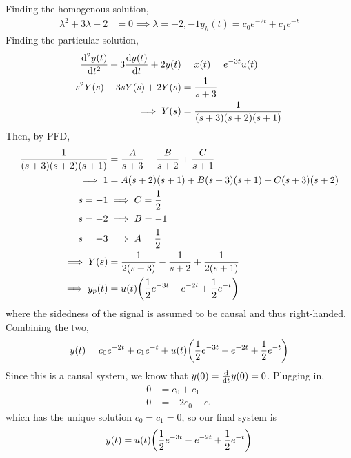 \documentclass{article}
\begin{document}
Finding the homogenous solution,
\begin{align}
    \lambda^2 + 3\lambda + 2 &= 0 \implies \lambda = -2, -1
    y_h(t) = c_0 e^{-2t} + c_1 e^{-t}
\end{align}
Finding the particular solution,
\begin{align}
    \dv[2]{y(t)}{t} + 3 \dv{y(t)}{t} + 2y(t) &= x(t) = e^{-3t} u(t) \\
    s^2 Y(s) + 3 s Y(s) + 2Y(s) &= \frac{1}{s + 3} \\
    \implies Y(s) &= \frac{1}{(s + 3) (s + 2) (s + 1)}
\end{align}
Then, by PFD,
\begin{align}
    \frac{1}{(s + 3) (s + 2) (s + 1)} &= \frac{A}{s + 3} + \frac{B}{s + 2} + \frac{C}{s + 1} \\
    \implies 1 &= A (s + 2) (s + 1) + B (s + 3) (s + 1) + C (s + 3) (s + 2) \\
    s = -1 &\implies C = \frac{1}{2} \\
    s = -2 &\implies B = -1 \\
    s = -3 &\implies A = \frac{1}{2} \\
    \implies Y(s) &= \frac{1}{2 (s + 3)} - \frac{1}{s + 2} + \frac{1}{2 (s + 1)} \\
    \implies y_p(t) &= u(t) \qty(\frac{1}{2} e^{-3t} - e^{-2t} + \frac{1}{2} e^{-t})
\end{align}
where the sidedness of the signal is assumed to be causal and thus right-handed.
Combining the two,
\begin{equation}
    y(t) = c_0 e^{-2t} + c_1 e^{-t} + u(t) \qty(\frac{1}{2} e^{-3t} - e^{-2t} + \frac{1}{2} e^{-t})
\end{equation}
Since this is a causal system, we know that \(y(0) = \dv{t} y(0) = 0\).
Plugging in,
\begin{align}
    0 &= c_0 + c_1 \\
    0 &= -2 c_0 - c_1
\end{align}
which has the unique solution \(c_0 = c_1 = 0\), so our final system is
\begin{equation}
    y(t) = u(t) \qty(\frac{1}{2} e^{-3t} - e^{-2t} + \frac{1}{2} e^{-t})
\end{equation}
\end{document}
